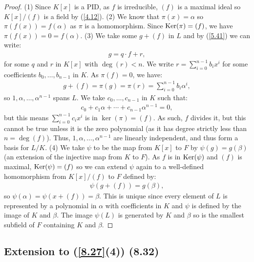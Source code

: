 \begin{proof}
    (1) Since $K[x]$ is a PID, as $f$ is irreducible, $(f)$ is a maximal ideal so
    $K[x] / (f)$ is a field by (\ref{4.12}).
    \bs
    (2) We know that $\pi(x) = \alpha$ so $\pi(f(x)) = f(\alpha)$ as $\pi$ is
    a homomorphism. Since $\operatorname{Ker}(\pi) = (f)$, we have $\pi(f(x)) = 0 = f(\alpha)$.
    \bs
    (3) We take some $g + (f)$ in $L$ and by (\ref{5.41}) we can write: \begin{align*}
        g = q \cdot f + r,
    \end{align*} for some $q$ and $r$ in $K[x]$ with $\deg(r) < n$. We write
    $r = \sum_{i = 0}^{n - 1} b_ix^i$ for some coefficients $b_0, \ldots, b_{n - 1}$ in
    $K$. As $\pi(f) = 0$, we have: \begin{align*}
        g + (f) = \pi(g) = \pi(r) = \sum_{i = 0}^{n - 1} b_i \alpha^i,
    \end{align*} so $1, \alpha, \ldots, \alpha^{n - 1}$ spans $L$. We take
    $c_0, \ldots, c_{n - 1}$ in $K$ such that: \begin{align*}
        c_0 + c_1\alpha + \cdots + c_{n - 1} \alpha^{n - 1} = 0,
    \end{align*} but this means $\sum_{i = 0}^{n - 1} c_ix^i$ is in $\ker(\pi) = (f)$.
    As such, $f$ divides it, but this cannot be true unless it is the zero polynomial
    (as it has degree strictly less than $n = \deg(f)$). Thus,
    $1, \alpha, \ldots, \alpha^{n - 1}$ are linearly independent, and thus form a basis
    for $L / K$.
    \newpage \noindent
    (4) We take $\psi$ to be the map from $K[x]$ to $F$ by $\psi(g) = g(\beta)$
    (an extension of the injective map from $K$ to $F$).
    As $f$ is in $\operatorname{Ker}(\psi)$ and $(f)$ is maximal, $\operatorname{Ker}(\psi) = (f)$ so we can
    extend $\psi$ again to a well-defined homomorphism from $K[x] / (f)$ to $F$ 
    defined by: \begin{align*}
        \psi(g + (f)) = g(\beta),
    \end{align*} so $\psi(\alpha) = \psi(x + (f)) = \beta$. This is unique since
    every element of $L$ is represented by a polynomial in $\alpha$ with coefficients
    in $K$ and $\psi$ is defined by the image of $K$ and $\beta$. 
    The image $\psi(L)$ is generated by $K$ and $\beta$ so is
    the smallest subfield of $F$ containing $K$ and $\beta$.
\end{proof}

\subsection{Extension to (\ref{8.27}(4)) (8.32)} \label{8.32}

